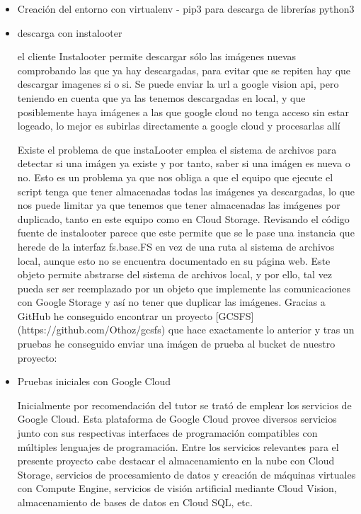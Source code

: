 \begin{itemize}
    \item Creación del entorno con virtualenv - pip3 para descarga de librerías python3
    \item descarga con instalooter
    
el cliente Instalooter permite descargar sólo las imágenes nuevas comprobando las que ya hay descargadas, para evitar que se repiten hay que descargar imagenes si o si. Se puede enviar la url a google vision api, pero teniendo en cuenta que ya las tenemos descargadas en local, y que posiblemente haya imágenes a las que google cloud no tenga acceso sin estar logeado, lo mejor es subirlas directamente a google cloud y procesarlas allí
    
Existe el problema de que instaLooter emplea el sistema de archivos para detectar si una imágen ya existe y por tanto, saber si una imágen es nueva o no. Esto es un problema ya que nos obliga a que el equipo que ejecute el script tenga que tener almacenadas todas las imágenes ya descargadas, lo que nos puede limitar ya que tenemos que tener almacenadas las imágenes por duplicado, tanto en este equipo como en Cloud Storage. Revisando el código fuente de instalooter parece que este permite que se le pase una instancia que herede de la interfaz fs.base.FS en vez de una ruta al sistema de archivos local, aunque esto no se encuentra documentado en su página web. Este objeto permite abstrarse del sistema de archivos local, y por ello, tal vez pueda ser ser reemplazado por un objeto que implemente las comunicaciones con Google Storage y así no tener que duplicar las imágenes. Gracias a GitHub he conseguido encontrar un proyecto [GCSFS](https://github.com/Othoz/gcsfs) que hace exactamente lo anterior y tras un pruebas he conseguido enviar una imágen de prueba al bucket de nuestro proyecto:
    
    
    \item Pruebas iniciales con Google Cloud
    
Inicialmente por recomendación del tutor se trató de emplear los servicios de Google Cloud. Esta plataforma de Google Cloud provee diversos servicios junto con sus respectivas interfaces de programación compatibles con múltiples lenguajes de programación. Entre los servicios relevantes para el presente proyecto cabe destacar el almacenamiento en la nube con Cloud Storage, servicios de procesamiento de datos y creación de máquinas virtuales con Compute Engine, servicios de visión artificial mediante Cloud Vision, almacenamiento de bases de datos en Cloud SQL, etc.


\end{itemize}
